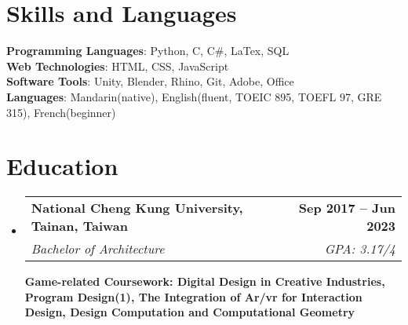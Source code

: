 \documentclass[letterpaper,11pt]{article}
\makeatletter
\newcommand{\resumeSubheading}[4]{
    \vspace{-2pt}\item
    \begin{tabular*}{1.0\textwidth}[t]{l@{\extracolsep{\fill}}r}
    \textbf{#1} & \textbf{\small #2} \\
    \textit{\small#3} & \textit{\small #4} \\
    \end{tabular*}\vspace{-7pt}
}
\newcommand{\resumeSubHeadingListStart}{\begin{itemize}[leftmargin=0.0in, label={}]}
\newcommand{\resumeSubHeadingListEnd}{\end{itemize}}
\makeatother
\begin{document}
\section{Skills and Languages}
\textbf{Programming Languages}{: Python, C, C\#, LaTex, SQL} \\
\textbf{Web Technologies}{: HTML, CSS, JavaScript} \\
\textbf{Software Tools}{: Unity, Blender, Rhino, Git, Adobe, Office}\\
\textbf{Languages}{: Mandarin(native), English(fluent, TOEIC 895, TOEFL 97, GRE 315), French(beginner)}

\section{Education}
\resumeSubHeadingListStart
\resumeSubheading
{National Cheng Kung University, Tainan, Taiwan}{Sep 2017 -- Jun 2023}
{Bachelor of Architecture}{GPA: 3.17/4}

\small{\textbf{Game-related Coursework: Digital Design in Creative Industries, Program Design(1), The Integration of Ar/vr for Interaction Design, Design Computation and Computational Geometry}}
\resumeSubHeadingListEnd



\end{document}

